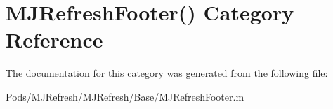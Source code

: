 \hypertarget{category_m_j_refresh_footer_07_08}{}\section{M\+J\+Refresh\+Footer() Category Reference}
\label{category_m_j_refresh_footer_07_08}


The documentation for this category was generated from the following file\+:\begin{DoxyCompactItemize}
\item 
Pods/\+M\+J\+Refresh/\+M\+J\+Refresh/\+Base/M\+J\+Refresh\+Footer.\+m\end{DoxyCompactItemize}
